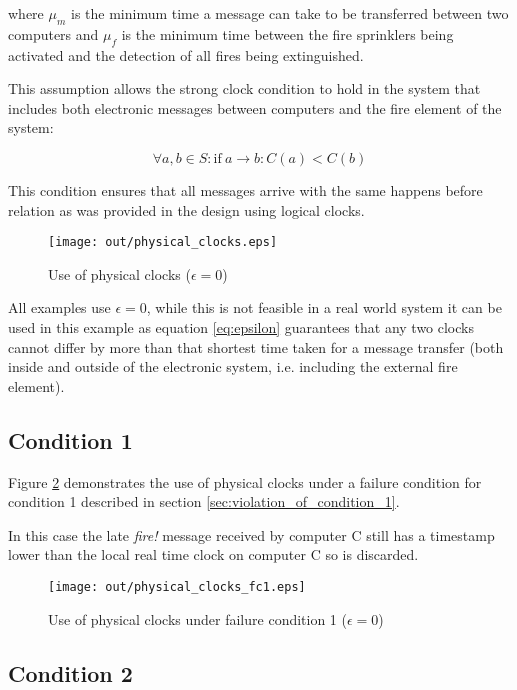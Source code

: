 \documentclass[twocolumn]{article}
\begin{document}
where $\mu_{m}$ is the minimum time a message can take to be transferred between
two computers and $\mu_{f}$ is the minimum time between the fire sprinklers
being activated and the detection of all fires being extinguished.

This assumption allows the strong clock condition to hold in the system that
includes both electronic messages between computers and the fire element of the
system:

\begin{equation}
  \forall a, b \in S : \mathrm{if} \: a \rightarrow b : C(a) < C(b)
  \label{eq:strong_clock_condition}
\end{equation}

This condition ensures that all messages arrive with the same happens before
relation as was provided in the design using logical clocks.

\begin{figure}[h!]
  \centering
  \texttt{[image: out/physical\_clocks.eps]}
  \caption{Use of physical clocks ($\epsilon = 0$)}
  \label{fig:physical_clocks}
\end{figure}

All examples use $\epsilon = 0$, while this is not feasible in a real world
system it can be used in this example as equation \ref{eq:epsilon} guarantees
that any two clocks cannot differ by more than that shortest time taken for a
message transfer (both inside and outside of the electronic system, i.e.
including the external fire element).

\subsection{Condition 1}

Figure \ref{fig:physical_clocks_fc1} demonstrates the use of physical clocks
under a failure condition for condition 1 described in section
\ref{sec:violation_of_condition_1}.

In this case the late \textit{fire!} message received by computer C still has a
timestamp lower than the local real time clock on computer C so is discarded.

\begin{figure}[h!]
  \centering
  \texttt{[image: out/physical\_clocks\_fc1.eps]}
  \caption{Use of physical clocks under failure condition 1 ($\epsilon = 0$)}
  \label{fig:physical_clocks_fc1}
\end{figure}

\subsection{Condition 2}
\end{document}

